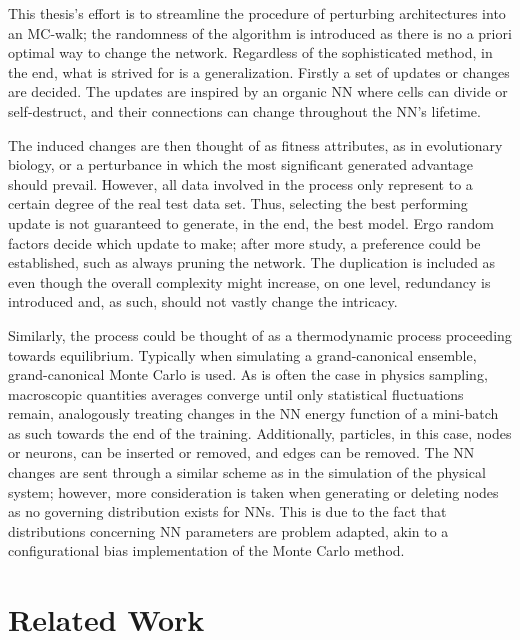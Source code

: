 This thesis's effort is to streamline the procedure of perturbing architectures into an MC-walk; the randomness of the algorithm is introduced as there is no a priori optimal way to change the network. Regardless of the sophisticated method, in the end, what is strived for is a generalization. Firstly a set of updates or changes are decided. The updates are inspired by an organic NN where cells can divide or self-destruct, and their connections can change throughout the NN's lifetime. 

The induced changes are then thought of as fitness attributes, as in evolutionary biology, or a perturbance in which the most significant generated advantage should prevail. However, all data involved in the process only represent to a certain degree of the real test data set. Thus, selecting the best performing update is not guaranteed to generate, in the end, the best model. Ergo random factors decide which update to make; after more study, a preference could be established, such as always pruning the network. The duplication is included as even though the overall complexity might increase, on one level, redundancy is introduced and, as such, should not vastly change the intricacy. 

Similarly, the process could be thought of as a thermodynamic process proceeding towards equilibrium. Typically when simulating a grand-canonical ensemble, grand-canonical Monte Carlo is used. As is often the case in physics sampling, macroscopic quantities averages converge until only statistical fluctuations remain, analogously treating changes in the NN energy function of a mini-batch as such towards the end of the training. Additionally, particles, in this case, nodes or neurons, can be inserted or removed, and edges can be removed. The NN changes are sent through a similar scheme as in the simulation of the physical system; however, more consideration is taken when generating or deleting nodes as no governing distribution exists for NNs. This is due to the fact that distributions concerning NN parameters are problem adapted, akin to a configurational bias implementation of the Monte Carlo method. 

\section{Related Work}

